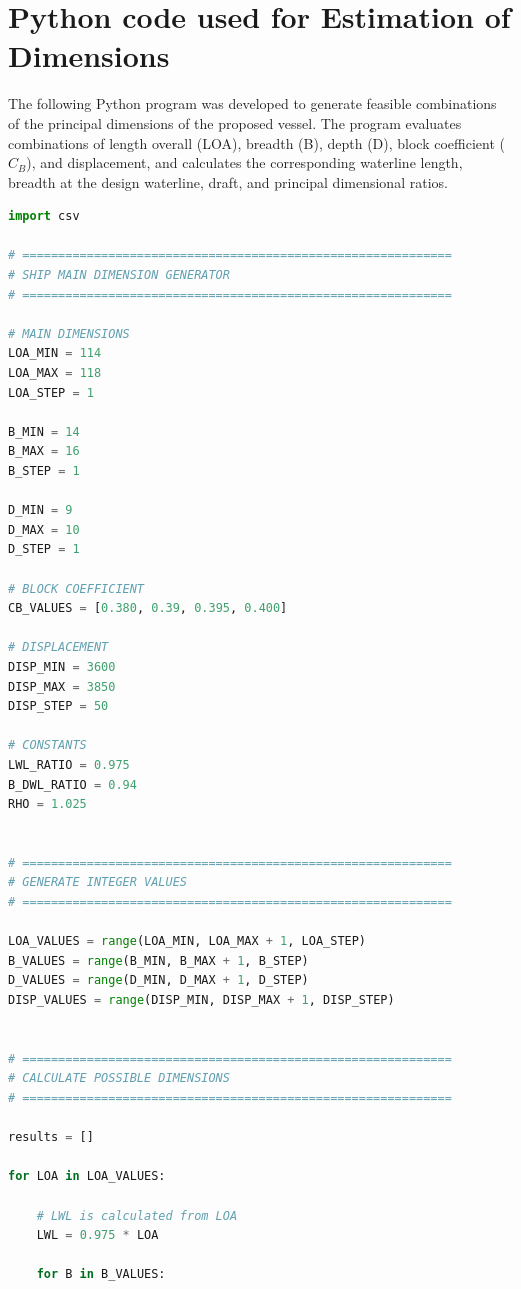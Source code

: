 \chapter{Python code used for  Estimation of Dimensions}
\label{app:ship_dimension_generator}

The following Python program was developed to generate feasible
combinations of the principal dimensions of the proposed vessel.
The program evaluates combinations of length overall (LOA), breadth
(B), depth (D), block coefficient ($C_B$), and displacement, and
calculates the corresponding waterline length, breadth at the design
waterline, draft, and principal dimensional ratios.

\begin{lstlisting}[language=Python,
    caption={Python program for generating feasible ship main dimensions},
    label={lst:ship_dimension_generator}]
import csv

# ============================================================
# SHIP MAIN DIMENSION GENERATOR
# ============================================================

# MAIN DIMENSIONS
LOA_MIN = 114
LOA_MAX = 118
LOA_STEP = 1

B_MIN = 14
B_MAX = 16
B_STEP = 1

D_MIN = 9
D_MAX = 10
D_STEP = 1

# BLOCK COEFFICIENT
CB_VALUES = [0.380, 0.39, 0.395, 0.400]

# DISPLACEMENT
DISP_MIN = 3600
DISP_MAX = 3850
DISP_STEP = 50

# CONSTANTS
LWL_RATIO = 0.975
B_DWL_RATIO = 0.94
RHO = 1.025


# ============================================================
# GENERATE INTEGER VALUES
# ============================================================

LOA_VALUES = range(LOA_MIN, LOA_MAX + 1, LOA_STEP)
B_VALUES = range(B_MIN, B_MAX + 1, B_STEP)
D_VALUES = range(D_MIN, D_MAX + 1, D_STEP)
DISP_VALUES = range(DISP_MIN, DISP_MAX + 1, DISP_STEP)


# ============================================================
# CALCULATE POSSIBLE DIMENSIONS
# ============================================================

results = []

for LOA in LOA_VALUES:

    # LWL is calculated from LOA
    LWL = 0.975 * LOA

    for B in B_VALUES:


\end{lstlisting}
